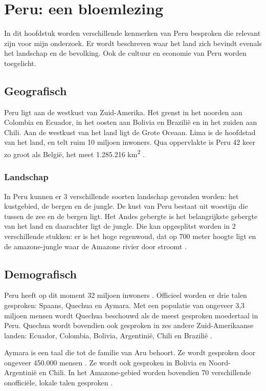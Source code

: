 \section{Peru: een bloemlezing}
In dit hoofdstuk worden verschillende kenmerken van Peru besproken die relevant zijn voor mijn onderzoek. Er wordt beschreven waar het land zich bevindt evenals het landschap en de bevolking. Ook de cultuur en economie van Peru worden toegelicht.

\subsection{Geografisch}
Peru ligt aan de westkust van Zuid-Amerika. Het grenst in het noorden aan Colombia en Ecuador, in het oosten aan Bolivia en Brazilië en in het zuiden aan Chili. Aan de westkust van het land ligt de Grote Oceaan. Lima is de hoofdstad van het land, en telt ruim 10 miljoen inwoners. Qua oppervlakte is Peru 42 keer zo groot als België, het meet 1.285.216 km\textsuperscript{2} \autocite{ToPeru2020}.

\subsubsection{Landschap}
In Peru kunnen er 3 verschillende soorten landschap gevonden worden: het kustgebied, de bergen en de jungle. De kust van Peru bestaat uit woestijn die tussen de zee en de bergen ligt. Het Andes gebergte is het belangrijkste gebergte van het land en daarachter ligt de jungle. Die kan opgesplitst worden in 2 verschillende stukken: er is het hoge regenwoud, dat op 700 meter hoogte ligt en de amazone-jungle waar de Amazone rivier door stroomt \autocite{ToPeru2020}.

\subsection{Demografisch}
Peru heeft op dit moment 32 miljoen inwoners \autocite{Overheid2020}. Officieel worden er drie talen gesproken: Spaans, Quechua en Aymara. 
Met een populatie van ongeveer 3,3 miljoen mensen wordt Quechua beschouwd als de meest gesproken moedertaal in Peru. Quechua wordt bovendien ook gesproken in zes andere Zuid-Amerikaanse landen: Ecuador, Colombia, Bolivia, Argentinië, Chili en Brazilië \autocite{Cultura2020}.

Aymara is een taal die tot de familie van Aru behoort. Ze wordt gesproken door ongeveer 450.000 mensen \autocite{CulturaPeru2020}. Ze wordt ook gesproken in Bolivia en Noord-Argentinië en Chili. In het Amazone-gebied worden bovendien 70 verschillende onofficiële, lokale talen gesproken \autocite{dosmanosperu2003}.

